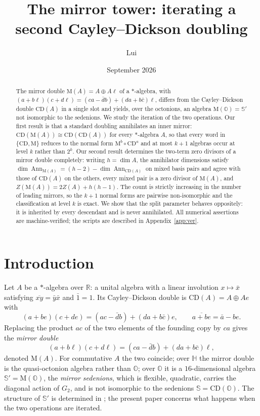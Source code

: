 \documentclass[11pt]{amsart}
\theoremstyle{plain}
\theoremstyle{definition}
\newcommand{\CD}{\mathrm{CD}}
\newcommand{\MM}{\mathrm{M}}
\newcommand{\Ann}{\operatorname{Ann}}
\newcommand{\OO}{\mathbb{O}}
\newcommand{\HH}{\mathbb{H}}
\newcommand{\RR}{\mathbb{R}}
\newcommand{\Sed}{\mathbb{S}}
\begin{document}
\title{The mirror tower: iterating a second Cayley--Dickson doubling}
\author{Lui}
\address{Quitman, Texas}
\date{September 2026}

\begin{abstract}
The mirror double $\MM(A)=A\oplus A\ell$ of a $*$-algebra, with
$(a+b\ell)(c+d\ell)=(ca-\bar d b)+(da+b\bar c)\ell$, differs from the
Cayley--Dickson double $\CD(A)$ in a single slot and yields, over the octonions,
an algebra $\MM(\OO)=\Sed'$ not isomorphic to the sedenions. We study the
iteration of the two operations. Our first result is that a standard doubling
annihilates an inner mirror: $\CD(\MM(A))\cong\CD(\CD(A))$ for every
$*$-algebra $A$, so that every word in $\{\CD,\MM\}$ reduces to the normal form
$\MM^{b}\circ\CD^{a}$ and at most $k+1$ algebras occur at level $k$ rather than
$2^{k}$. Our second result determines the two-term zero divisors of a mirror
double completely: writing $h=\dim A$, the annihilator dimensions satisfy
$\dim\Ann_{\MM(A)}=(h-2)-\dim\Ann_{\CD(A)}$ on mixed basis pairs and agree with
those of $\CD(A)$ on the others, every mixed pair is a zero divisor of $\MM(A)$,
and $Z(\MM(A))=2Z(A)+h(h-1)$. The count is strictly increasing in the number of
leading mirrors, so the $k+1$ normal forms are pairwise non-isomorphic and the
classification at level $k$ is exact. We show that the split parameter behaves
oppositely: it is inherited by every descendant and is never annihilated. All
numerical assertions are machine-verified; the scripts are described in
Appendix~\ref{app:ver}.
\end{abstract}

\maketitle

\section{Introduction}

Let $A$ be a $*$-algebra over $\RR$: a unital algebra with a linear involution
$x\mapsto\bar x$ satisfying $\overline{xy}=\bar y\bar x$ and $\bar 1=1$. Its
Cayley--Dickson double is $\CD(A)=A\oplus Ae$ with
\begin{equation}\label{eq:cd}
  (a+be)(c+de)=(ac-\bar d b)+(da+b\bar c)e,\qquad \overline{a+be}=\bar a-be .
\end{equation}
Replacing the product $ac$ of the two elements of the founding copy by $ca$
gives the \emph{mirror double}
\begin{equation}\label{eq:m}
  (a+b\ell)(c+d\ell)=(ca-\bar d b)+(da+b\bar c)\ell ,
\end{equation}
denoted $\MM(A)$. For commutative $A$ the two coincide; over $\HH$ the mirror
double is the quasi-octonion algebra rather than $\OO$; over $\OO$ it is a
$16$-dimensional algebra $\Sed'=\MM(\OO)$, the \emph{mirror sedenions}, which is
flexible, quadratic, carries the diagonal action of $G_2$, and is not isomorphic
to the sedenions $\Sed=\CD(\OO)$. The structure of $\Sed'$ is determined in
\cite{LuiI}; the present paper concerns what happens when the two operations are
iterated.
\end{document}
